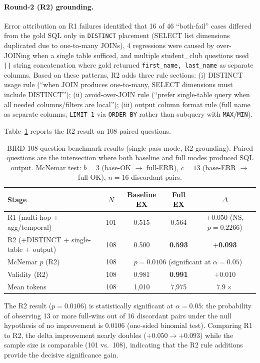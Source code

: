 \documentclass[11pt]{article}
\begin{document}
\paragraph{Round-2 (R2) grounding.} Error attribution on R1 failures identified that 16 of 46 ``both-fail'' cases differed from the gold SQL only in \texttt{DISTINCT} placement (SELECT list dimensions duplicated due to one-to-many JOINs), 4 regressions were caused by over-JOINing when a single table sufficed, and multiple student\_club questions used \texttt{||} string concatenation where gold returned \texttt{first\_name, last\_name} as separate columns. Based on these patterns, R2 adds three rule sections: (i) DISTINCT usage rule (``when JOIN produces one-to-many, SELECT dimensions must include DISTINCT''); (ii) avoid-over-JOIN rule (``prefer single-table query when all needed columns/filters are local''); (iii) output column format rule (full name as separate columns; \texttt{LIMIT 1} via \texttt{ORDER BY} rather than subquery with \texttt{MAX}/\texttt{MIN}).

Table~\ref{tab:bird} reports the R2 result on 108 paired questions.

\begin{table}[t]
\centering
\caption{BIRD 108-question benchmark results (single-pass mode, R2 grounding). Paired questions are the intersection where both baseline and full modes produced SQL output. McNemar test: $b=3$ (base-OK $\to$ full-ERR), $c=13$ (base-ERR $\to$ full-OK), $n=16$ discordant pairs.}
\label{tab:bird}
\begin{tabular}{lcccc}
\toprule
Stage & $N$ & Baseline EX & Full EX & $\Delta$ \\
\midrule
R1 (multi-hop + agg/temporal)     & 101 & 0.515 & 0.564 & $+$0.050 (NS, $p=0.2266$) \\
R2 (+DISTINCT + single-table + output) & 108 & 0.500 & \textbf{0.593} & $+$\textbf{0.093} \\
\midrule
McNemar $p$ (R2) & 108 & \multicolumn{3}{c}{\textbf{$p=0.0106$} (significant at $\alpha=0.05$)} \\
Validity (R2)    & 108 & 0.981 & \textbf{0.991} & $+$0.010 \\
Mean tokens      & 108 & 1{,}010 & 7{,}975 & $7.9\times$ \\
\bottomrule
\end{tabular}
\end{table}

The R2 result ($p=0.0106$) is statistically significant at $\alpha=0.05$: the probability of observing 13 or more full-wins out of 16 discordant pairs under the null hypothesis of no improvement is $0.0106$ (one-sided binomial test). Comparing R1 to R2, the delta improvement nearly doubles ($+0.050 \to +0.093$) while the sample size is comparable (101 vs.\ 108), indicating that the R2 rule additions provide the decisive significance gain.
\end{document}
